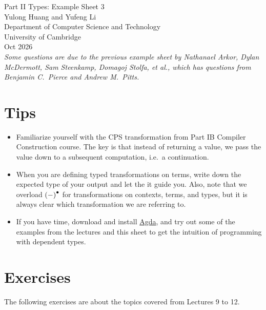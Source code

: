 \documentclass[11pt,a4paper,twoside]{article}
\begin{document}
\begin{center}
  {\Huge Part II Types: Example Sheet 3}\\
  \vspace{1.0em}
  {\large Yulong Huang and Yufeng Li}\\
  \vspace{0.5em}
  {\small Department of Computer Science and Technology \\ University
  of Cambridge \\ Oct 2026}\\
  \vspace{1.0em}
  \small{\textit{Some questions are due to the previous example sheet
      by Nathanael Arkor, Dylan McDermott, Sam Steenkamp, Domagoj Stolfa,
  et al., which has questions from Benjamin C.~Pierce and Andrew M.~Pitts.}}
\end{center}

\section*{Tips}

\begin{itemize}
  \item Familiarize yourself with the CPS transformation from Part IB
    Compiler Construction course.
    The key is that instead of returning a value,
    we pass the value down to a subsequent computation, i.e.~a continuation.

  \item When you are defining typed transformations on terms, write
    down the expected type of your output
    and let the it guide you.
    Also, note that we overload ${(-)}^{\bullet}$ for transformations on
    contexts, terms, and types,
    but it is always clear which transformation we are referring to.

  \item If you have time, download and install
    \href{https://agda.readthedocs.io/en/latest/getting-started/installation.html}{Agda},
    and try out some of the examples from the lectures and this sheet
    to get the intuition of programming with dependent types.
\end{itemize}

\section*{Exercises}

The following exercises are about the topics covered from Lectures 9 to 12.
\end{document}
